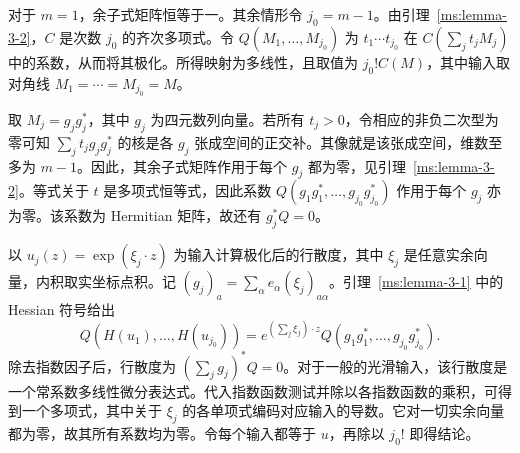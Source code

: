 对于 $m=1$，余子式矩阵恒等于一。其余情形令 $j_0=m-1$。由引理~\ref{ms:lemma-3-2}，$C$ 是次数 $j_0$ 的齐次多项式。令 $Q(M_1,\ldots,M_{j_0})$ 为 $t_1\cdots t_{j_0}$ 在 $C(\sum_jt_jM_j)$ 中的系数，从而将其极化。所得映射为多线性，且取值为 $j_0!C(M)$，其中输入取对角线 $M_1=\cdots=M_{j_0}=M$。

取 $M_j=g_jg_j^*$，其中 $g_j$ 为四元数列向量。若所有 $t_j>0$，令相应的非负二次型为零可知 $\sum_jt_jg_jg_j^*$ 的核是各 $g_j$ 张成空间的正交补。其像就是该张成空间，维数至多为 $m-1$。因此，其余子式矩阵作用于每个 $g_j$ 都为零，见引理~\ref{ms:lemma-3-2}。等式关于 $t$ 是多项式恒等式，因此系数 $Q(g_1g_1^*,\ldots,g_{j_0}g_{j_0}^*)$ 作用于每个 $g_j$ 亦为零。该系数为 Hermitian 矩阵，故还有 $g_j^*Q=0$。

以 $u_j(z)=\exp(\xi_j\cdot z)$ 为输入计算极化后的行散度，其中 $\xi_j$ 是任意实余向量，内积取实坐标点积。记 $(g_j)_a=\sum_\alpha e_\alpha(\xi_j)_{a\alpha}$。引理~\ref{ms:lemma-3-1} 中的 Hessian 符号给出
\[
Q(H(u_1),\ldots,H(u_{j_0}))
=e^{(\sum_j\xi_j)\cdot z}Q(g_1g_1^*,\ldots,g_{j_0}g_{j_0}^*).
\]
除去指数因子后，行散度为 $(\sum_jg_j)^*Q=0$。对于一般的光滑输入，该行散度是一个常系数多线性微分表达式。代入指数函数测试并除以各指数函数的乘积，可得到一个多项式，其中关于 $\xi_j$ 的各单项式编码对应输入的导数。它对一切实余向量都为零，故其所有系数均为零。令每个输入都等于 $u$，再除以 $j_0!$ 即得结论。
